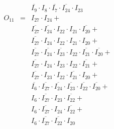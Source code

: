 \documentclass[a4paper,russian]{report}
\begin{document}
\begin{eqnarray*}
	& &  \overline{I_{9}} \cdotp I_{8} \cdotp \overline{I_{7}} \cdotp \overline{I_{24}} \cdotp I_{23} \\
    O_{11} & = & I_{27} \cdotp I_{24} + \\
	& &  \overline{I_{27}} \cdotp \overline{I_{24}} \cdotp I_{22} \cdotp I_{21} \cdotp \overline{I_{20}} + \\
	& &  \overline{I_{27}} \cdotp I_{24} \cdotp I_{22} \cdotp I_{21} \cdotp I_{20} + \\
	& &  \overline{I_{27}} \cdotp \overline{I_{24}} \cdotp \overline{I_{23}} \cdotp I_{22} \cdotp \overline{I_{21}} \cdotp \overline{I_{20}} + \\
	& &  \overline{I_{27}} \cdotp I_{24} \cdotp I_{23} \cdotp I_{22} \cdotp \overline{I_{21}} + \\
	& &  \overline{I_{27}} \cdotp I_{23} \cdotp I_{22} \cdotp \overline{I_{21}} \cdotp I_{20} + \\
	& &  \overline{I_{6}} \cdotp \overline{I_{27}} \cdotp \overline{I_{24}} \cdotp \overline{I_{23}} \cdotp \overline{I_{22}} \cdotp \overline{I_{20}} + \\
	& &  I_{6} \cdotp \overline{I_{27}} \cdotp I_{23} \cdotp \overline{I_{22}} + \\
	& &  I_{6} \cdotp \overline{I_{27}} \cdotp I_{24} \cdotp \overline{I_{22}} + \\
	& &  I_{6} \cdotp \overline{I_{27}} \cdotp \overline{I_{22}} \cdotp I_{20} \\
 \end{eqnarray*}
\end{document}
